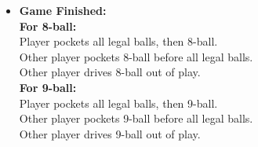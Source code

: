 \begin{itemize}
	\item \textbf{Game Finished:}\\
		\textbf{For 8-ball:}\\
		\hspace*{10 mm}Player pockets all legal balls, then 8-ball.\\
		\hspace*{10 mm}Other player pockets 8-ball before all legal balls.\\
		\hspace*{10 mm}Other player drives 8-ball out of play.\\
		\textbf{For 9-ball:}\\
		\hspace*{10 mm}Player pockets all legal balls, then 9-ball.\\
		\hspace*{10 mm}Other player pockets 9-ball before all legal balls.\\
		\hspace*{10 mm}Other player drives 9-ball out of play.\\
\end{itemize}


